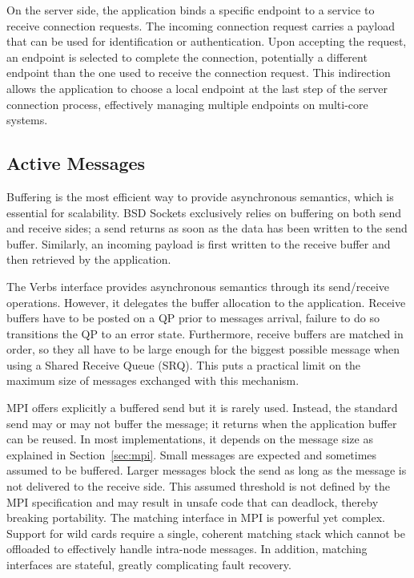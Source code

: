 On the server side, the application binds a specific endpoint to a service to receive connection requests. The incoming connection request carries a payload that can be used for identification or authentication. Upon accepting the request, an endpoint is selected to complete the connection, potentially a different endpoint than the one used to receive the connection request. This indirection allows the application to choose a local endpoint at the last step of the server connection process, effectively managing multiple endpoints on multi-core systems.

\subsection{Active Messages}
Buffering is the most efficient way to provide asynchronous semantics, which 
is essential for scalability. BSD Sockets exclusively relies on buffering on both 
send and receive sides; a send returns as soon as the data has been 
written to the send buffer. Similarly, an incoming payload is first 
written to the receive buffer and then retrieved by the application.

The Verbs interface provides asynchronous semantics through its send/receive
operations. However, it delegates the buffer allocation to the application. 
Receive buffers have to be posted on a QP prior to messages arrival, failure to do so transitions the QP to an error state. Furthermore, receive buffers are matched in order, so they all have to be large enough for the 
biggest possible message when using a Shared Receive Queue (SRQ). 
This puts a practical limit on the maximum size of messages exchanged with 
this mechanism.

MPI offers explicitly a buffered send but it is rarely used. Instead, the 
standard send may or may not buffer the message; it returns when 
the application buffer can be reused. In most implementations, it 
depends on the message size as explained in Section~\ref{sec:mpi}. 
Small messages are expected and sometimes assumed to be buffered. Larger 
messages block the send as long as the message is not delivered to the receive 
side. This assumed threshold is not defined by the MPI 
specification and may result in unsafe code that can deadlock, thereby breaking 
portability. 
The matching interface in MPI is powerful yet complex. Support 
for wild cards require a single, coherent matching stack which cannot be 
offloaded to effectively handle intra-node messages. In addition, matching 
interfaces are stateful,  greatly complicating fault recovery.

